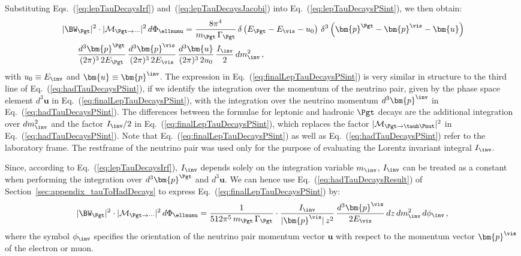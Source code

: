 Substituting Eqs.~(\ref{eq:lepTauDecaysIrf})
and~(\ref{eq:lepTauDecaysJacobi}) into
Eq.~(\ref{eq:lepTauDecaysPSint}), we then obtain:
\begin{equation}
\begin{aligned}
& \, \vert \BW_{\Pgt} \vert^{2} \cdot \vert\mathcal{M}_{\Pgt\to\cdots}\vert^{2} \,
 d\Phi_{\ellnunu} = \frac{8\pi^{4}}{m_{\Pgt} \, \Gamma_{\Pgt}} \,
 \delta \left( E_{\Pgt} - E_{\vis} - u_{0} \right)
 \, \delta^{3} \left( \bm{p}^{\Pgt} - \bm{p}^{\vis} -
  \bm{u} \right) \\
& \qquad \frac{d^{3}\bm{p}^{\Pgt}}{(2\pi)^{3} \, 2 E_{\Pgt}} \,
  \frac{d^{3}\bm{p}^{\vis}}{(2\pi)^{3} \, 2 E_{\vis}} \, 
  \frac{d^{3}\bm{u}}{(2\pi)^{3} \, 2 u_{0}} \, \frac{I_{\inv}}{2} \,
  dm^{2}_{\inv} \, ,
\end{aligned}
\label{eq:finalLepTauDecaysPSint}
\end{equation}
with $u_{0} \equiv E_{\inv}$ and $\bm{u} \equiv \bm{p}^{\inv}$.
The expression in Eq.~(\ref{eq:finalLepTauDecaysPSint}) is very similar in structure to the third line of Eq.~(\ref{eq:hadTauDecaysPSint}),
if we identify the integration over the momentum of the neutrino pair,
given by the phase space element $d^{3}\bm{u}$ in Eq.~(\ref{eq:finalLepTauDecaysPSint}), 
with the integration over the neutrino momentum $d^{3}\bm{p}^{\inv}$ in Eq.~(\ref{eq:hadTauDecaysPSint}).
The differences between the formulae for leptonic and hadronic $\Pgt$ decays
are the additional integration over $dm^{2}_{\inv}$ and the
factor $I_{\inv}/2$ in Eq.~(\ref{eq:finalLepTauDecaysPSint}), which replaces the
factor $\vert\mathcal{M}_{\Pgt \to
  \tauh\Pnut}\vert^{2}$ in Eq.~(\ref{eq:hadTauDecaysPSint}).
Note that Eq.~(\ref{eq:finalLepTauDecaysPSint}) as well as Eq.~(\ref{eq:hadTauDecaysPSint}) refer to the laboratory frame.
The restframe of the neutrino pair was used only for the purpose of evaluating the Lorentz invariant integral $I_{\inv}$.

Since, according to Eq.~(\ref{eq:lepTauDecaysIrf}), $I_{\inv}$ 
depends solely on the integration variable $m_{\inv}$, 
$I_{\inv}$ can be treated as a constant when performing the integration over $d^{3}\bm{p}^{\Pgt}$ and $d^{3}\bm{u}$.
We can hence use Eq.~(\ref{eq:hadTauDecaysResult}) of Section~\ref{sec:appendix_tauToHadDecays} to express Eq.~(\ref{eq:finalLepTauDecaysPSint}) by:
\begin{align}
\vert \BW_{\Pgt} \vert^{2} \cdot \vert\mathcal{M}_{\Pgt\to\cdots}\vert^{2} \,
 d\Phi_{\ellnunu} = \frac{1}{512\pi^{5}\, m_{\Pgt} \, \Gamma_{\Pgt}} \cdot 
    \frac{I_{\inv}}{\vert\bm{p}^{\vis}\vert \, z^{2}} \, 
    \frac{d^{3}\bm{p}^{\vis}}{2 E_{\vis}} \, dz \, dm^{2}_{\inv} \,
    d\phi_{\inv} \, ,
\label{eq:lepTauDecaysResult}
\end{align}
where the symbol $\phi_{\inv}$ specifies the orientation of the neutrino
pair momentum vector $\bm{u}$ with respect to the momentum vector $\bm{p}^{\vis}$
of the electron or muon.

